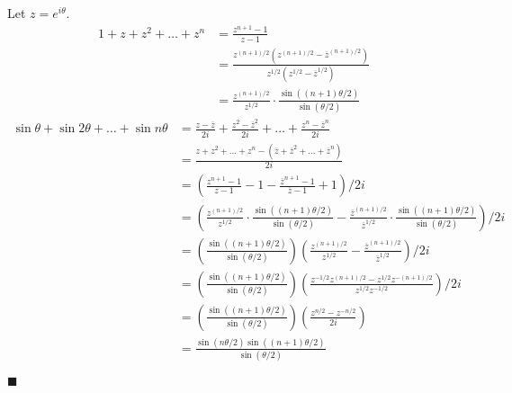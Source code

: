 \documentclass[12pt]{article}
\renewcommand{\qed}{\hfill$\blacksquare$}
\renewenvironment{proof}{\vspace{0em}\begin{addmargin}[2em]{0em}\begin{newproof}}{\end{newproof}\end{addmargin}\qed}
\begin{document}
\begin{proof}
	Let $z = e^{i\theta}$.
\begin{align*}
	1 + z + z^2 + \ldots + z^n &= \frac{z^{n+1} - 1}{z - 1} \\
				   &= \frac{z^{(n+1)/2}(z^{(n+1)/2} - \overline{z}^{(n+1)/2})}{z^{1/2}(z^{1/2} - \overline{z}^{1/2})} \\
				  &= \frac{z^{(n+1)/2}}{z^{1/2}}\cdot \frac{\sin((n+1)\theta/2)}{\sin(\theta/2)}
\end{align*}
\begin{align*}
	\sin \theta + \sin 2\theta + \ldots + \sin n\theta &= \frac{z - \overline{z}}{2i} + \frac{z^2 - \overline{z}^2}{2i} + \ldots + \frac{z^n - \overline{z}^n}{2i} \\
							   &= \frac{z + z^2 + \ldots + z^n - (\overline{z} + \overline{z}^2 + \ldots + \overline{z}^n)}{2i} \\
							   &= \left(\frac{z^{n+1} - 1}{z - 1} - 1 - \frac{\overline{z}^{n+1} - 1}{\overline{z} - 1} + 1 \right)/2i \\
							   &= \left(\frac{z^{(n+1)/2}}{z^{1/2}}\cdot\frac{\sin((n+1)\theta/2)}{\sin(\theta/2)} - \frac{\overline{z}^{(n+1)/2}}{\overline{z}^{1/2}}\cdot\frac{\sin((n+1)\theta/2)}{\sin(\theta/2)}\right)/2i \\
							   &= \left(\frac{\sin((n+1)\theta/2)}{\sin(\theta/2)}\right)\left(\frac{z^{(n+1)/2}}{z^{1/2}} - \frac{\overline{z}^{(n+1)/2}}{\overline{z}^{1/2}}\right)/2i \\
							   &= \left(\frac{\sin((n+1)\theta/2)}{\sin(\theta/2)}\right)\left(\frac{z^{-1/2}z^{(n+1)/2} - z^{1/2}z^{-(n+1)/2}}{z^{1/2}z^{-1/2}}\right)/2i \\
							   &= \left(\frac{\sin((n+1)\theta/2)}{\sin(\theta/2)}\right)\left(\frac{z^{n/2} - z^{-n/2}}{2i}\right) \\
							   &= \frac{\sin(n\theta/2)\sin((n+1)\theta/2)}{\sin(\theta/2)}
\end{align*}
\end{proof}
\end{document}
